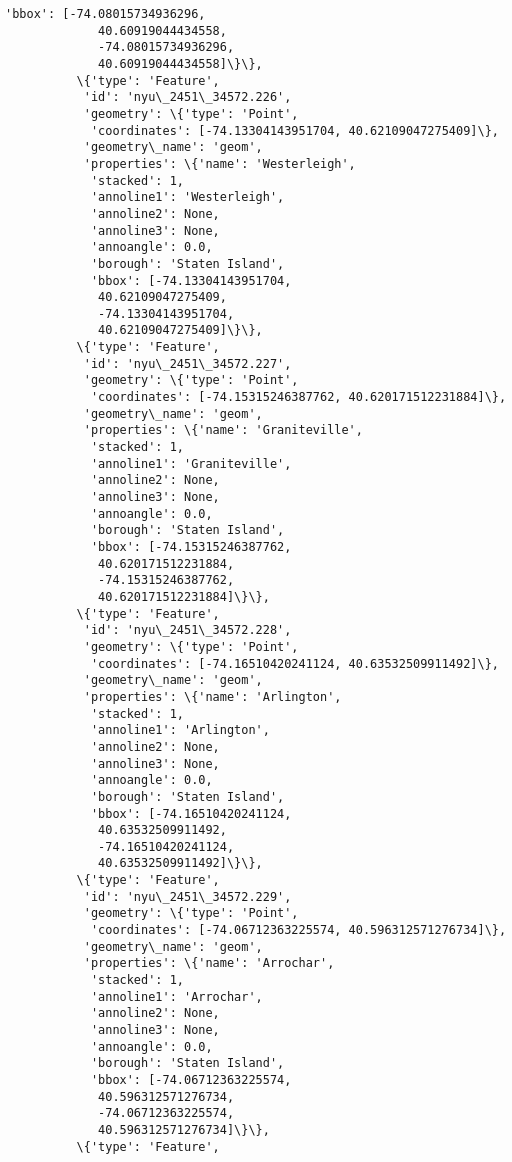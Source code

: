 \documentclass[11pt]{article}
\begin{document}
\begin{Verbatim}[commandchars=\\\{\}]
            'bbox': [-74.08015734936296,
             40.60919044434558,
             -74.08015734936296,
             40.60919044434558]\}\},
          \{'type': 'Feature',
           'id': 'nyu\_2451\_34572.226',
           'geometry': \{'type': 'Point',
            'coordinates': [-74.13304143951704, 40.62109047275409]\},
           'geometry\_name': 'geom',
           'properties': \{'name': 'Westerleigh',
            'stacked': 1,
            'annoline1': 'Westerleigh',
            'annoline2': None,
            'annoline3': None,
            'annoangle': 0.0,
            'borough': 'Staten Island',
            'bbox': [-74.13304143951704,
             40.62109047275409,
             -74.13304143951704,
             40.62109047275409]\}\},
          \{'type': 'Feature',
           'id': 'nyu\_2451\_34572.227',
           'geometry': \{'type': 'Point',
            'coordinates': [-74.15315246387762, 40.620171512231884]\},
           'geometry\_name': 'geom',
           'properties': \{'name': 'Graniteville',
            'stacked': 1,
            'annoline1': 'Graniteville',
            'annoline2': None,
            'annoline3': None,
            'annoangle': 0.0,
            'borough': 'Staten Island',
            'bbox': [-74.15315246387762,
             40.620171512231884,
             -74.15315246387762,
             40.620171512231884]\}\},
          \{'type': 'Feature',
           'id': 'nyu\_2451\_34572.228',
           'geometry': \{'type': 'Point',
            'coordinates': [-74.16510420241124, 40.63532509911492]\},
           'geometry\_name': 'geom',
           'properties': \{'name': 'Arlington',
            'stacked': 1,
            'annoline1': 'Arlington',
            'annoline2': None,
            'annoline3': None,
            'annoangle': 0.0,
            'borough': 'Staten Island',
            'bbox': [-74.16510420241124,
             40.63532509911492,
             -74.16510420241124,
             40.63532509911492]\}\},
          \{'type': 'Feature',
           'id': 'nyu\_2451\_34572.229',
           'geometry': \{'type': 'Point',
            'coordinates': [-74.06712363225574, 40.596312571276734]\},
           'geometry\_name': 'geom',
           'properties': \{'name': 'Arrochar',
            'stacked': 1,
            'annoline1': 'Arrochar',
            'annoline2': None,
            'annoline3': None,
            'annoangle': 0.0,
            'borough': 'Staten Island',
            'bbox': [-74.06712363225574,
             40.596312571276734,
             -74.06712363225574,
             40.596312571276734]\}\},
          \{'type': 'Feature',

\end{Verbatim}
\end{document}
